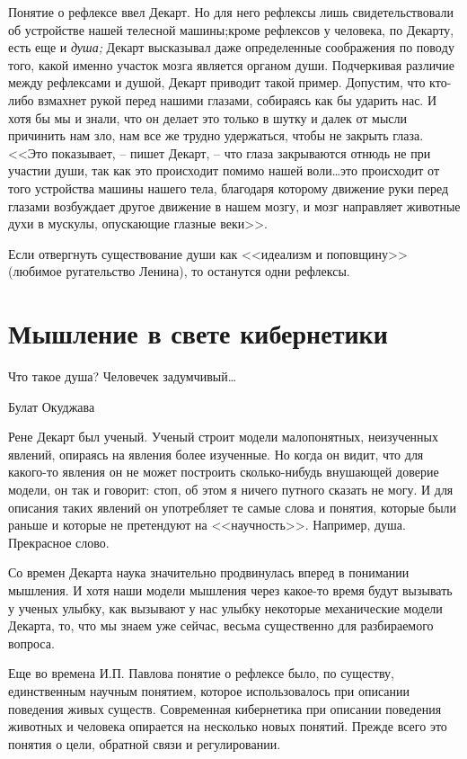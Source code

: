 \documentclass{book}
\begin{document}
Понятие о рефлексе ввел Декарт. Но для него рефлексы лишь свидетельствовали об устройстве нашей телесной машины;кроме рефлексов 
у человека, по Декарту, есть еще и \textit{душа;} Декарт высказывал даже определенные соображения по пово­ду того, какой именно участок 
мозга является органом души. Подчеркивая различие между рефлексами и душой, Декарт приводит такой пример. Допустим, что кто-либо 
взмахнет рукой перед нашими глазами, собираясь как бы ударить нас. И хотя бы мы и знали, что он делает это только в шутку и 
далек от мысли причинить нам зло, нам все же трудно удержаться, чтобы не закрыть глаза. <<Это показывает, -- пишет Декарт, -- что 
глаза закрываются отнюдь не при участии души, так как это происхо­дит помимо нашей воли\ldots это происходит от того устройства 
машины нашего тела, благодаря которому движение руки перед глазами возбуждает другое движение в нашем мозгу, и мозг направляет 
животные духи в мускулы, опускающие глазные веки>>.%

Если отвергнуть существование души как <<идеализм и по­повщину>> (любимое ругательство Ленина), то останутся одни рефлексы.

\section{Мышление в свете кибернетики}
\epigraph{Что такое душа? Человечек задумчивый\ldots}{Булат Окуджава}

Рене Декарт был ученый. Ученый строит модели малопонятных, неизученных явлений, опираясь на явления более изученные. Но когда он 
видит, что для какого-то явления он не может построить сколько-нибудь внушающей доверие модели, он так и говорит: стоп, об этом 
я ничего путного сказать не могу. И для описания таких явлений он употребляет те самые слова и понятия, которые были раньше и 
которые не претендуют на <<научность>>. Например, душа. Прекрасное слово.

Со времен Декарта наука значительно продвинулась вперед в понимании мышления. И хотя наши модели мышления через какое-то время 
будут вызывать у ученых улыбку, как вызы­вают у нас улыбку некоторые механические модели Декарта, то, что мы знаем уже сейчас, 
весьма существенно для разбираемого вопроса.

Еще во времена И.П. Павлова понятие о рефлексе было, по существу, единственным научным понятием, которое использовалось при 
описании поведения живых существ. Совре­менная кибернетика при описании поведения животных и чело­века опирается на несколько 
новых понятий. Прежде всего это понятия о цели, обратной связи и регулировании.
\end{document}

